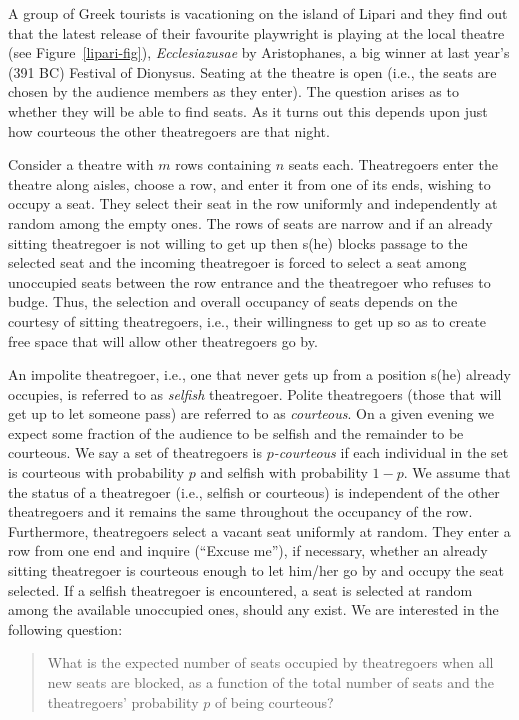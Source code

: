 \documentclass[11pt]{llncs}
\begin{document}
A group of Greek tourists is vacationing on the island of Lipari and they find
out that the latest release of their favourite playwright is playing 
at the local theatre (see Figure~\ref{lipari-fig}), {\em Ecclesiazusae} by Aristophanes, a big winner at last year's (391 BC)
Festival of Dionysus. Seating at the theatre is open (i.e., the seats are chosen by the audience members as 
they enter). The question arises as to whether they will be able to find seats. As it turns out
this depends upon just how courteous the other theatregoers are that night. 



Consider a theatre with $m$ rows containing $n$ seats each. 
Theatregoers enter the theatre along aisles, choose a row, and enter it from one of its ends, wishing
to occupy a seat. They
select their seat in the row uniformly and
independently at random among the empty ones.
The rows of seats are narrow and
if an already sitting theatregoer is not willing to get up
then s(he) blocks passage to the selected seat and the incoming theatregoer
is forced to select a seat among unoccupied seats
between the row entrance and the theatregoer who refuses to budge. 
Thus, the selection and overall occupancy of seats depends on
the courtesy of sitting theatregoers, i.e.,  their
willingness to get up so as to create  free space
that will allow other theatregoers go by.




An impolite theatregoer, i.e., one that never gets up from
a position s(he) already occupies, is referred to as {\em selfish} theatregoer.
Polite theatregoers (those that will get up to let someone pass) are
referred to as {\em courteous}. 
On a given evening we expect some fraction of the audience to be selfish
and the remainder to be courteous. We say a set of theatregoers is
{\em $p$-courteous} 
if each individual in the set is courteous with probability $p$ and 
selfish with probability $1-p$.
We assume that the status of a
theatregoer (i.e., selfish or courteous)
is independent of the other theatregoers and it
remains the same throughout the
occupancy of the row. Furthermore, theatregoers select a vacant seat uniformly
at random. They enter a row from one end
and inquire (``Excuse me''), if necessary, whether an already
sitting theatregoer is courteous enough to let him/her go by and occupy
the seat selected. If a selfish theatregoer is encountered, a seat is selected
at random among the available unoccupied ones, should any exist. 
We are interested in the following question:
\begin{quote}
What is the expected number of seats
occupied by theatregoers when all
new seats are blocked,
as a function of the total
number of seats and the theatregoers' probability $p$ of being courteous? 
\end{quote}
\end{document}
